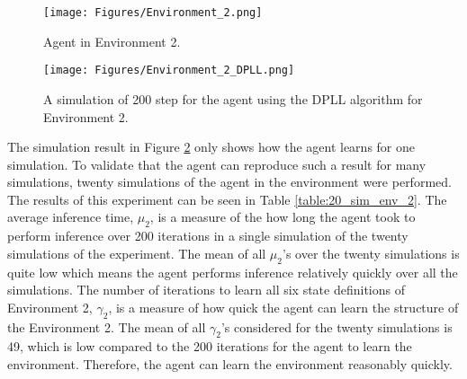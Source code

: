 \begin{figure}[H]
    \centering
    \texttt{[image: Figures/Environment\_2.png]}
    \caption{Agent in Environment 2.}
    \label{fig:env_2}
\end{figure}

\vspace{-0.7cm}

\begin{figure}[H]
    \centering
    \texttt{[image: Figures/Environment\_2\_DPLL.png]}
    \caption{A simulation of 200 step for the agent using the DPLL algorithm for Environment 2.}
    \label{fig:env_2_sim}
\end{figure}

\vspace{-0.6cm}

The simulation result in Figure \ref{fig:env_2_sim} only shows how the agent learns for one simulation. To validate that the agent can reproduce such a result for many simulations, twenty simulations of the agent in the environment were performed. The results of this experiment can be seen in Table \ref{table:20_sim_env_2}.
The average inference time, $\mu_2$, is a measure of the how long the agent took to perform inference over 200 iterations in a single simulation of the twenty simulations of the experiment. The mean of all $\mu_2$'s over the twenty simulations is quite low which means the agent performs inference relatively quickly over all the simulations. The number of iterations to learn all six state definitions of Environment 2, $\gamma_2$, is a measure of how quick the agent can learn the structure of the Environment 2. The mean of all $\gamma_2$'s considered for the twenty simulations is 49, which is low compared to the 200 iterations for the agent to learn the environment. Therefore, the agent can learn the environment reasonably quickly.



